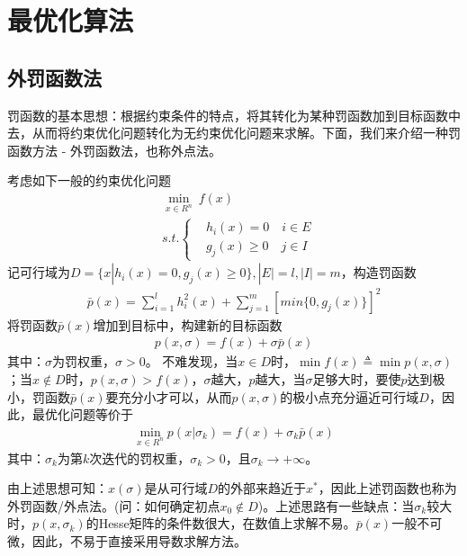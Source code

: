 \section{最优化算法}
    \subsection{外罚函数法}
        \par
        罚函数的基本思想：根据约束条件的特点，将其转化为某种罚函数加到目标函数中去，从而将约束优化问题转化为无约束优化问题来求解。下面，我们来介绍一种罚函数方法 - 外罚函数法，也称外点法。
        \par
        考虑如下一般的约束优化问题
        \begin{align*}
        &\mathop {\min}\limits_{x\in R^n}\  f(x)\\
        &s.t.\left\{
        \begin{aligned}
        &h_i(x)=0\quad i \in E\\
        &g_j(x) \geqslant 0\quad j \in I
        \end{aligned}
        \right.
        \end{align*}
        记可行域为$D=\{x|h_i(x)=0,g_j(x) \geqslant 0\},|E|=l,|I|=m$，构造罚函数
        \begin{align*}
        \bar{p}(x)=\mathop {\sum}\limits_{i=1}^lh_i^2(x) + \mathop {\sum}\limits_{j=1}^m[min\{0,g_j(x)\}]^2
        \end{align*}
        将罚函数$\bar{p}(x)$增加到目标中，构建新的目标函数
        \begin{align*}
        p(x,\sigma)=f(x)+\sigma \bar{p}(x)
        \end{align*}
        其中：$\sigma$为罚权重，$\sigma >0$。
        不难发现，当$x \in D$时，$\min f(x) \triangleq \min p(x,\sigma)$；当$x \notin D$时，$p(x,\sigma)>f(x)$，$\sigma$越大，$p$越大，当$\sigma$足够大时，要使$p$达到极小，罚函数$\bar{p}(x)$要充分小才可以，从而$p(x,\sigma)$的极小点充分逼近可行域$D$，因此，最优化问题等价于
        \begin{align*}
        \mathop {\min}\limits_{x \in R^n}p(x|{\sigma}_k)=f(x)+{\sigma}_k\bar{p}(x)
        \end{align*}
        其中：${\sigma}_k$为第$k$次迭代的罚权重，${\sigma}_k>0$，且${\sigma}_k \to +\infty$。
        \par
        由上述思想可知：$x(\sigma)$是从可行域$D$的外部来趋近于$x^*$，因此上述罚函数也称为外罚函数/外点法。(问：如何确定初点$x_0 \notin D$)。上述思路有一些缺点：当${\sigma}_k$较大时，$p(x,{\sigma}_k)$的Hesse矩阵的条件数很大，在数值上求解不易。$\bar{p}(x)$一般不可微，因此，不易于直接采用导数求解方法。
